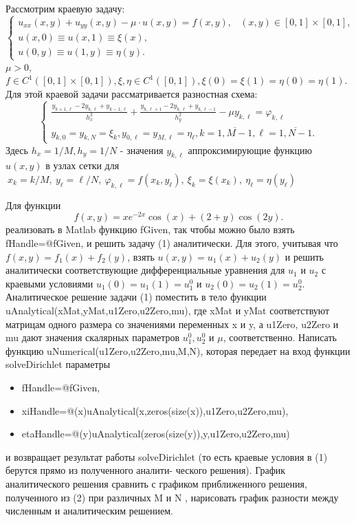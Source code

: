 \documentclass[11pt]{article}
\begin{document}
Рассмотрим краевую задачу:
\begin{equation}
\begin{cases}
    u_{xx}(x, y) + u_{yy}(x, y) - \mu \cdot u(x, y) = f(x, y), & (x, y) \in [0, 1] \times [0, 1], \\
    u(x, 0) \equiv u(x, 1) \equiv \xi(x), \\
    u(0, y) \equiv u(1, y) \equiv \eta(y).
\end{cases}
\end{equation}
$\mu > 0$, $f \in C^1([0, 1] \times [0, 1]), \xi, \eta \in C^1([0, 1]), \xi(0) = \xi(1) = \eta(0) = \eta(1)$.
Для этой краевой задачи рассматривается разностная схема:
\begin{equation}
\begin{cases}
    \frac{y_{k+1, \ell} - 2y_{k, \ell} + y_{k-1, \ell}}{h_x^2}+ \frac{y_{k, \ell+1} - 2y_{k, \ell} + y_{k, \ell-1}}{h_y^2}-\mu y_{k, \ell} = \varphi_{k,\ell} \\
     y_{k, 0} = y_{k, N} = \xi_k, y_{0, \ell}=y_{M, \ell}=\eta_\ell, k = \overline{1, M-1}, \ell = \overline{1, N-1}.
\end{cases}
\end{equation}
Здесь $h_x=1/M, h_y = 1/N$ - значения $y_{k,\ell}$ аппроксимирующие функцию $u(x, y)$ в узлах сетки для $\ x_k=k/M, \ y_\ell=\ell / N, \ \varphi_{k, \ell}=f(x_k, y_\ell), \ \xi_k=\xi(x_k),\ \eta_\ell=\eta(y_\ell)$

\vspace{0.5cm} 

Для функции
\[
f(x, y) = xe^{-2x}\cos(x) + (2+y)\cos(2y).
\]
реализовать в Matlab функцию fGiven, так чтобы можно было взять fHandle=@fGiven, и решить задачу (1) аналитически. Для этого, учитывая что $f(x, y) = f_1(x) + f_2(y)$, взять $u(x, y) = u_1(x) + u_2(y)$ и решить аналитически соответствующие дифференциальные уравнения для $u_1$ и
$u_2$ с краевыми условиями $u_1(0) = u_1(1) = u_1^0$ и $u_2(0) = u_2(1) = u_2^0$.
Аналитическое решение задачи (1) поместить в
тело функции uAnalytical(xMat,yMat,u1Zero,u2Zero,mu), где xMat и yMat соответствуют матрицам одного размера со
значениями переменных x и y, а u1Zero, u2Zero и mu дают значения скалярных параметров $u_1^0, u_2^0$ и $\mu$, соответственно.
Написать функцию uNumerical(u1Zero,u2Zero,mu,M,N), которая передает на вход функции solveDirichlet параметры
\begin{itemize}
    \item fHandle=@fGiven,
    \item xiHandle=@(x)uAnalytical(x,zeros(size(x)),u1Zero,u2Zero,mu),
    \item etaHandle=@(y)uAnalytical(zeros(size(y)),y,u1Zero,u2Zero,mu)
\end{itemize}
и возвращает результат работы solveDirichlet (то есть краевые условия в (1) берутся прямо из полученного аналити-
ческого решения). График аналитического решения сравнить с графиком приближенного решения, полученного из (2)
при различных M и N , нарисовать график разности между численным и аналитическим решением.
\end{document}
